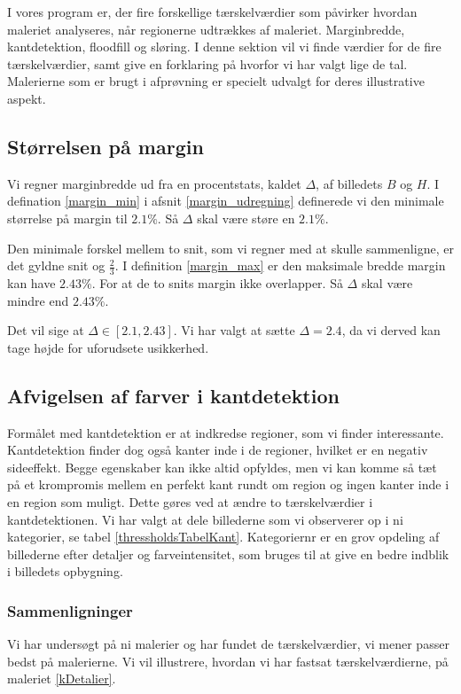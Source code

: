 {\sffamily
I vores program er, der fire forskellige tærskelværdier som påvirker
hvordan maleriet analyseres, når regionerne udtrækkes af maleriet.
Marginbredde, kantdetektion, floodfill og sløring. I denne sektion vil
vi finde værdier for de fire tærskelværdier, samt give en forklaring på hvorfor vi
har valgt lige de tal. Malerierne som er brugt i afprøvning er specielt
udvalgt for deres illustrative aspekt. 
}

\subsection{Størrelsen på margin}
Vi regner marginbredde ud fra en procentstats, kaldet $\Delta$, af
billedets $B$ og $H$. I defination \ref{margin_min} i afsnit \ref{margin_udregning} definerede vi den
minimale størrelse på margin til $2.1 \%$. Så $\Delta$ skal være støre en
$2.1 \%$. 

Den minimale forskel mellem to snit, som vi regner med at skulle sammenligne, er
det gyldne snit og $\frac{2}{3}$. I definition \ref{margin_max} er den
maksimale bredde margin kan have $2.43\%$. For at de to snits margin ikke
overlapper. Så $\Delta$ skal være mindre end $2.43\%$. 

Det vil sige at $\Delta \in [2.1, 2.43]$. Vi har valgt at
sætte $\Delta = 2.4$, da vi derved kan tage højde for uforudsete
usikkerhed.

\subsection{Afvigelsen af farver i kantdetektion}
Formålet med kantdetektion er at indkredse regioner, som vi finder
interessante. Kantdetektion finder dog også kanter inde i de regioner,
hvilket er en negativ sideeffekt. Begge egenskaber kan ikke altid opfyldes, men vi kan komme så tæt
på et krompromis mellem en perfekt kant rundt om region og ingen kanter
inde i en region som muligt. Dette gøres ved at ændre to tærskelværdier
i kantdetektionen. Vi har valgt at dele billederne som vi observerer op
i ni kategorier, se tabel \ref{thressholdsTabelKant}. Kategoriernr er en
grov opdeling af billederne efter detaljer og farveintensitet, som
bruges til at give en bedre indblik i billedets opbygning.

\subsubsection{Sammenligninger}
Vi har undersøgt på ni malerier og har fundet de tærskelværdier, vi mener
passer bedst på malerierne. Vi vil illustrere, hvordan vi har fastsat
tærskelværdierne, på maleriet \ref{kDetalier}.

